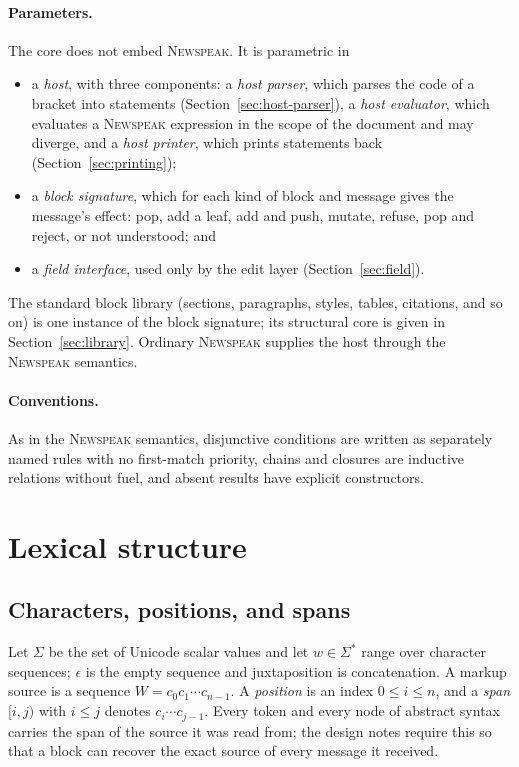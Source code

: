 \documentclass[11pt]{article}
\numberwithin{equation}{section}
\newcommand{\NS}{\textsc{Newspeak}}
\begin{document}
\paragraph{Parameters.}
The core does not embed \NS.  It is parametric in
\begin{itemize}
\item a \emph{host}, with three components: a \emph{host parser}, which
      parses the code of a bracket into statements
      (Section~\ref{sec:host-parser}), a \emph{host evaluator}, which
      evaluates a \NS{} expression in the scope of the document and may
      diverge, and a \emph{host printer}, which prints statements back
      (Section~\ref{sec:printing});
\item a \emph{block signature}, which for each kind of block and message
      gives the message's effect: pop, add a leaf, add and push, mutate,
      refuse, pop and reject, or not understood; and
\item a \emph{field interface}, used only by the edit layer
      (Section~\ref{sec:field}).
\end{itemize}
The standard block library (sections, paragraphs, styles, tables, citations,
and so on) is one instance of the block signature; its structural core is
given in Section~\ref{sec:library}.  Ordinary \NS{} supplies the host through the
\NS{} semantics.

\paragraph{Conventions.}
As in the \NS{} semantics, disjunctive conditions are written as separately
named rules with no first-match priority, chains and closures are inductive
relations without fuel, and absent results have explicit constructors.

\section{Lexical structure}
\label{sec:lexical}

\subsection{Characters, positions, and spans}

Let $\Sigma$ be the set of Unicode scalar values and let $w \in \Sigma^*$
range over character sequences; $\epsilon$ is the empty sequence and
juxtaposition is concatenation.  A markup source is a sequence
$W = c_0 c_1 \cdots c_{n-1}$.  A \emph{position} is an index
$0 \le i \le n$, and a \emph{span} $[i,j)$ with $i \le j$ denotes
$c_i \cdots c_{j-1}$.  Every token and every node of abstract syntax carries
the span of the source it was read from; the design notes require this so
that a block can recover the exact source of every message it received.
\end{document}
